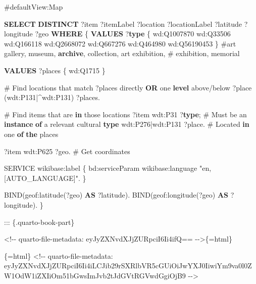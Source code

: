 \documentclass[
  a4paper,
  openany]{book}
\newenvironment{Shaded}{\begin{snugshade}}{\end{snugshade}}
\newcommand{\CharTok}[1]{\textcolor[rgb]{0.13,0.47,0.30}{#1}}
\newcommand{\CommentTok}[1]{\textcolor[rgb]{0.37,0.37,0.37}{#1}}
\newcommand{\KeywordTok}[1]{\textcolor[rgb]{0.00,0.23,0.31}{\textbf{#1}}}
\newcommand{\NormalTok}[1]{\textcolor[rgb]{0.00,0.23,0.31}{#1}}
\newcommand{\OperatorTok}[1]{\textcolor[rgb]{0.37,0.37,0.37}{#1}}
\newcommand{\OtherTok}[1]{\textcolor[rgb]{0.00,0.23,0.31}{#1}}
\begin{document}
\begin{Shaded}
\begin{Highlighting}[]
\NormalTok{\#defaultView}\CharTok{:Map}

\KeywordTok{SELECT} \KeywordTok{DISTINCT}\NormalTok{ ?item ?itemLabel ?location ?locationLabel ?latitude ?longitude ?geo }\KeywordTok{WHERE}\NormalTok{ \{}
  \KeywordTok{VALUES}\NormalTok{ ?}\KeywordTok{type}\NormalTok{ \{ wd}\CharTok{:Q1007870}\NormalTok{ wd}\CharTok{:Q33506}\NormalTok{ wd}\CharTok{:Q166118}\NormalTok{ wd}\CharTok{:Q2668072}\NormalTok{ wd}\CharTok{:Q667276} 
\NormalTok{                 wd}\CharTok{:Q464980}\NormalTok{ wd}\CharTok{:Q56190453}\NormalTok{ \}}
\NormalTok{  \#art gallery, museum, }\KeywordTok{archive}\NormalTok{, collection, art exhibition, }
\NormalTok{  \# exhibition, memorial}
  
  \KeywordTok{VALUES}\NormalTok{ ?places \{ wd}\CharTok{:Q1715}\NormalTok{ \} }

\NormalTok{  \# Find locations that match ?places directly }\KeywordTok{OR}\NormalTok{ one }\KeywordTok{level}\NormalTok{ above}\OperatorTok{/}\NormalTok{below}
\NormalTok{  ?place (wdt}\CharTok{:P131}\NormalTok{|\^{}wdt}\CharTok{:P131}\NormalTok{) ?places. }

\NormalTok{  \# Find items that are }\KeywordTok{in}\NormalTok{ those locations}
\NormalTok{  ?item wdt}\CharTok{:P31}\NormalTok{ ?}\KeywordTok{type}\NormalTok{;  \# Must be an }\KeywordTok{instance} \KeywordTok{of}\NormalTok{ a relevant cultural }\KeywordTok{type}
\NormalTok{        wdt}\CharTok{:P276}\NormalTok{|wdt}\CharTok{:P131}\NormalTok{ ?place.  \# Located }\KeywordTok{in}\NormalTok{ one }\KeywordTok{of} \KeywordTok{the}\NormalTok{ places}
  
\NormalTok{  ?item wdt}\CharTok{:P625}\NormalTok{ ?geo.  \# Get coordinates}

\NormalTok{  SERVICE wikibase}\CharTok{:label}\NormalTok{ \{ bd}\CharTok{:serviceParam}\NormalTok{ wikibase}\CharTok{:language} \OtherTok{"en,[AUTO\_LANGUAGE]"}\NormalTok{. \}}

\NormalTok{  BIND(geof}\CharTok{:latitude}\NormalTok{(?geo) }\KeywordTok{AS}\NormalTok{ ?latitude).}
\NormalTok{  BIND(geof}\CharTok{:longitude}\NormalTok{(?geo) }\KeywordTok{AS}\NormalTok{ ?longitude).}
\NormalTok{\}\textasciigrave{}\textasciigrave{}\textasciigrave{}}








\NormalTok{::: \{.quarto}\OperatorTok{{-}}\NormalTok{book}\OperatorTok{{-}}\NormalTok{part\}}


\NormalTok{\textasciigrave{}}\OperatorTok{\textless{}}\NormalTok{!}\CommentTok{{-}{-} quarto{-}file{-}metadata: eyJyZXNvdXJjZURpciI6Ii4ifQ== {-}{-}\textgreater{}\textasciigrave{}\{=html\}}

\NormalTok{\textasciigrave{}\textasciigrave{}\textasciigrave{}\{}\OperatorTok{=}\NormalTok{html\}}
\OperatorTok{\textless{}}\NormalTok{!}\CommentTok{{-}{-} quarto{-}file{-}metadata: eyJyZXNvdXJjZURpciI6Ii4iLCJib29rSXRlbVR5cGUiOiJwYXJ0IiwiYm9va0l0ZW1OdW1iZXIiOm51bGwsImJvb2tJdGVtRGVwdGgiOjB9 {-}{-}\textgreater{}}
\end{Highlighting}
\end{Shaded}
\end{document}
